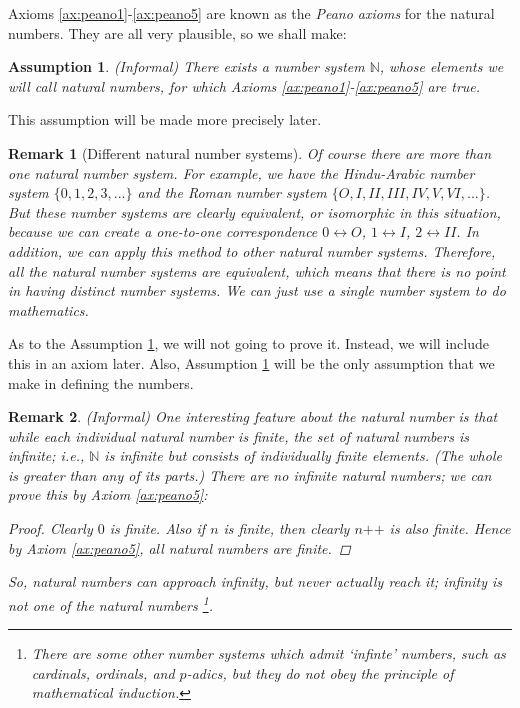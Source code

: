 \documentclass[a4paper,oneside]{book}
\newtheorem*{proof}{\textit{Proof.}}
\newtheorem{assumption}{Assumption}[chapter]
\newtheorem{remark}{Remark}[section]
\begin{document}
			Axioms \ref{ax:peano1}-\ref{ax:peano5} are known as the \textit{Peano axioms} for the natural numbers. They are all very plausible, so we shall make:
			\begin{assumption}
				\label{assumption1}
				(Informal) There exists a number system $\mathbb{N}$, whose elements we will call natural numbers, for which Axioms \ref{ax:peano1}-\ref{ax:peano5} are true.
			\end{assumption}
			This assumption will be made more precisely later.
			\begin{remark}[Different natural number systems]
				Of course there are more than one natural number system. For example, we have the Hindu-Arabic number system $\{0,1,2,3,...\}$ and the Roman number system $\{O,I,I\!I,I\!I\!I,I\!V,V,V\!I,...\}$. But these number systems are clearly equivalent, or isomorphic in this situation, because we can create a one-to-one correspondence $0\leftrightarrow O$, $1\leftrightarrow I$, $2\leftrightarrow I\!I$. In addition, we can apply this method to other natural number systems. Therefore, all the natural number systems are equivalent, which means that there is no point in having distinct number systems. We can just use a single number system to do mathematics.
			\end{remark}
			As to the Assumption \ref{assumption1}, we will not going to prove it. Instead, we will include this in an axiom later. Also, Assumption \ref{assumption1} will be the only assumption that we make in defining the numbers.
			\begin{remark}
				(Informal) One interesting feature about the natural number is that while each individual natural number is finite, the \textit{set} of natural numbers is infinite; i.e., $\mathbb{N}$ is infinite but consists of individually finite elements. (The whole is greater than any of its parts.) There are no infinite natural numbers; we can prove this by Axiom \ref{ax:peano5}:
				\begin{proof}
					Clearly $0$ is finite. Also if $n$ is finite, then clearly $n \texttt{++}$ is also finite. Hence by Axiom \ref{ax:peano5}, all natural numbers are finite.
				\end{proof}
				So, natural numbers can \textit{approach} infinity, but never actually \textit{reach} it; infinity is not one of the natural numbers \footnote{There are some other number systems which admit `infinte' numbers, such as cardinals, ordinals, and $p$-adics, but they do not obey the principle of mathematical induction.}.
			\end{remark}
\end{document}
